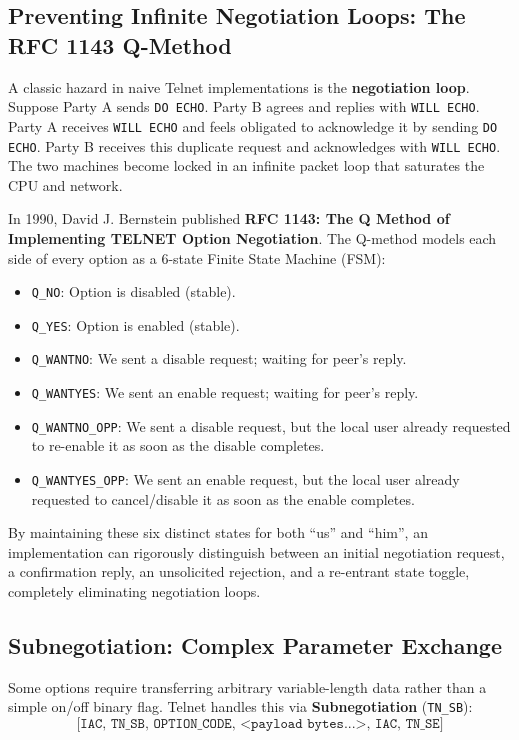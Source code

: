 \subsection{Preventing Infinite Negotiation Loops: The RFC 1143 Q-Method}

A classic hazard in naive Telnet implementations is the \textbf{negotiation loop}. Suppose Party A sends \texttt{DO ECHO}. Party B agrees and replies with \texttt{WILL ECHO}. Party A receives \texttt{WILL ECHO} and feels obligated to acknowledge it by sending \texttt{DO ECHO}. Party B receives this duplicate request and acknowledges with \texttt{WILL ECHO}. The two machines become locked in an infinite packet loop that saturates the CPU and network.

In 1990, David J. Bernstein published \textbf{RFC 1143: The Q Method of Implementing TELNET Option Negotiation}. The Q-method models each side of every option as a 6-state Finite State Machine (FSM):
\begin{itemize}[leftmargin=1.5em]
    \item \texttt{Q\_NO}: Option is disabled (stable).
    \item \texttt{Q\_YES}: Option is enabled (stable).
    \item \texttt{Q\_WANTNO}: We sent a disable request; waiting for peer's reply.
    \item \texttt{Q\_WANTYES}: We sent an enable request; waiting for peer's reply.
    \item \texttt{Q\_WANTNO\_OPP}: We sent a disable request, but the local user already requested to re-enable it as soon as the disable completes.
    \item \texttt{Q\_WANTYES\_OPP}: We sent an enable request, but the local user already requested to cancel/disable it as soon as the enable completes.
\end{itemize}
By maintaining these six distinct states for both ``us'' and ``him'', an implementation can rigorously distinguish between an initial negotiation request, a confirmation reply, an unsolicited rejection, and a re-entrant state toggle, completely eliminating negotiation loops.

\subsection{Subnegotiation: Complex Parameter Exchange}

Some options require transferring arbitrary variable-length data rather than a simple on/off binary flag. Telnet handles this via \textbf{Subnegotiation} (\texttt{TN\_SB}):
\begin{equation}
\label{eq:subneg_structure}
\texttt{[IAC, TN\_SB, OPTION\_CODE, <payload bytes...>, IAC, TN\_SE]}
\end{equation}

